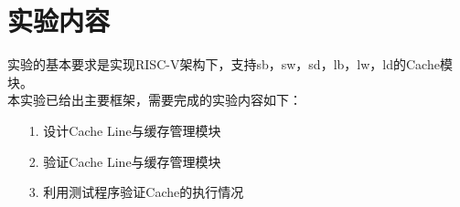 
\section{实验内容}
实验的基本要求是实现RISC-V架构下，支持sb，sw，sd，lb，lw，ld的Cache模块。 \\
本实验已给出主要框架，需要完成的实验内容如下：
\begin{itemize}
    \item [1.] 设计Cache Line与缓存管理模块
    \item [2.] 验证Cache Line与缓存管理模块
    \item [3.] 利用测试程序验证Cache的执行情况
\end{itemize}  